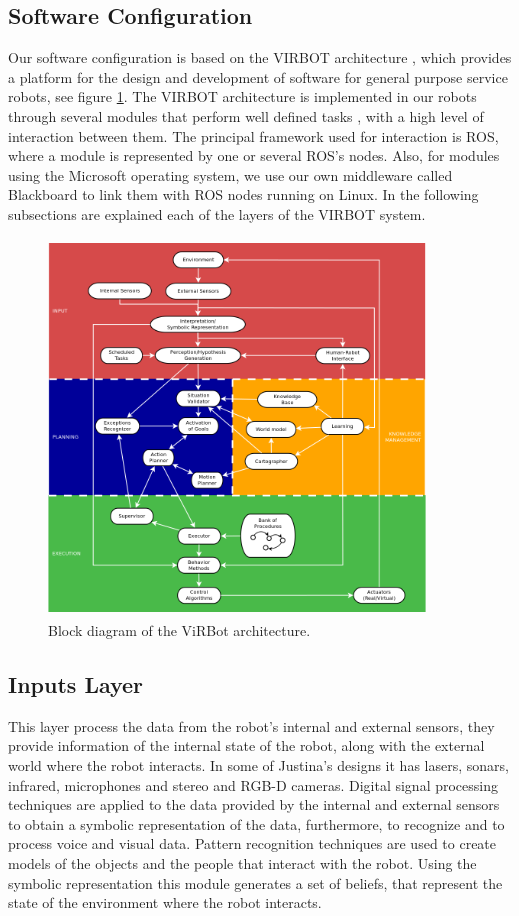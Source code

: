 \documentclass{llncs}
\begin{document}
\subsection{Software Configuration}
Our software configuration is based on the VIRBOT architecture \cite{virbot}, 
which provides a platform for the design and development of software for general purpose service robots, see figure \ref{fig:virbot}. 
The VIRBOT architecture is implemented in our robots through several modules that perform well defined tasks \cite{muller}, with a 
high level of interaction between them. The principal framework used for interaction is ROS, where a module is represented by one or 
several ROS's nodes. Also, for modules using the Microsoft operating system, we use our own middleware called Blackboard to
link them with ROS nodes running on Linux.
In the following subsections are explained each of the layers of the VIRBOT system.


\begin{figure}[h]
	\centering
	\includegraphics[angle=0, height=10cm, width=10cm]{Figures/ViRBot.png}
	\caption{Block diagram of the ViRBot architecture.}
	\label{fig:virbot}
\end{figure}


\subsection{Inputs Layer}

This layer process the data from the robot's internal and external sensors, they provide information of the internal state of the robot, along with the external world where the robot interacts.
In some of Justina's designs it has lasers, sonars, infrared, microphones and stereo and RGB-D cameras.
Digital signal processing techniques are applied to the data provided by the internal and external sensors to obtain a symbolic representation of the data, furthermore, to recognize and to process voice and visual data.
Pattern recognition techniques are used to create models of the objects and the people that interact with the robot.
Using the symbolic representation this module generates a set of beliefs, that represent the state of the environment where the robot interacts.
\end{document}
